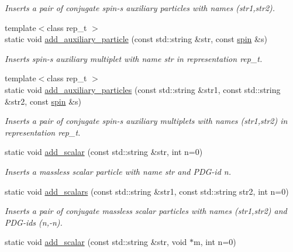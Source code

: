 \begin{DoxyCompactItemize}
\begin{DoxyCompactList}\small\item\em Inserts a pair of conjugate spin-\/s auxiliary particles with names (str1,str2). \end{DoxyCompactList}\item 
{\footnotesize template$<$class rep\-\_\-t $>$ }\\static void \hyperlink{a00370_aa1e50838292e002cb2997f8d34e376bf}{add\-\_\-auxiliary\-\_\-particle} (const std\-::string \&str, const \hyperlink{a00501}{spin} \&s)
\begin{DoxyCompactList}\small\item\em Inserts spin-\/s auxiliary multiplet with name str in representation rep\-\_\-t. \end{DoxyCompactList}\item 
\hypertarget{a00370_a8888489c8a72e26cba9a34772adabf8a}{{\footnotesize template$<$class rep\-\_\-t $>$ }\\static void \hyperlink{a00370_a8888489c8a72e26cba9a34772adabf8a}{add\-\_\-auxiliary\-\_\-particles} (const std\-::string \&str1, const std\-::string \&str2, const \hyperlink{a00501}{spin} \&s)}\label{a00370_a8888489c8a72e26cba9a34772adabf8a}

\begin{DoxyCompactList}\small\item\em Inserts a pair of conjugate spin-\/s auxiliary multiplets with names (str1,str2) in representation rep\-\_\-t. \end{DoxyCompactList}\item 
\hypertarget{a00370_a2472b1dfd3f7da1bbba6140aad987257}{static void \hyperlink{a00370_a2472b1dfd3f7da1bbba6140aad987257}{add\-\_\-scalar} (const std\-::string \&str, int n=0)}\label{a00370_a2472b1dfd3f7da1bbba6140aad987257}

\begin{DoxyCompactList}\small\item\em Inserts a massless scalar particle with name str and P\-D\-G-\/id n. \end{DoxyCompactList}\item 
\hypertarget{a00370_a9030576274aac8572d1546868e46e650}{static void \hyperlink{a00370_a9030576274aac8572d1546868e46e650}{add\-\_\-scalars} (const std\-::string \&str1, const std\-::string str2, int n=0)}\label{a00370_a9030576274aac8572d1546868e46e650}

\begin{DoxyCompactList}\small\item\em Inserts a pair of conjugate massless scalar particles with names (str1,str2) and P\-D\-G-\/ids (n,-\/n). \end{DoxyCompactList}\item 
\hypertarget{a00370_ad83cae9524f80d31eed52d6b28b99bfa}{static void \hyperlink{a00370_ad83cae9524f80d31eed52d6b28b99bfa}{add\-\_\-scalar} (const std\-::string \&str, void $\ast$m, int n=0)}\label{a00370_ad83cae9524f80d31eed52d6b28b99bfa}


\end{DoxyCompactItemize}
